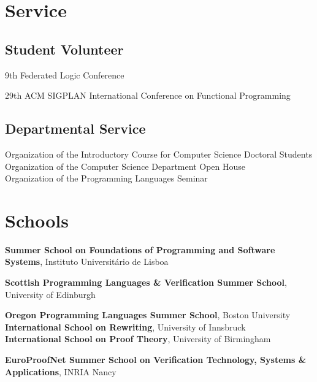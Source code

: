 \documentclass[12pt,a4paper]{moderncv}
\newenvironment{datedescription}{%
    \begin{description}[
        style=multiline,
        labelwidth=66pt,
        labelsep=6pt,
        leftmargin=72pt,
        align=right,
        font=\normalfont\itshape,
        itemsep=0.25em,
        parsep=0pt,
        topsep=0.25em
    ]
}{\end{description}}
\begin{document}

\section{Service}

\subsection{Student Volunteer}

\begin{datedescription}
    \item[2026] 9th Federated Logic Conference
    \item[2024] 29th ACM SIGPLAN International Conference on Functional Programming
\end{datedescription}

\subsection{Departmental Service}


\begin{datedescription}
    \item[2026] Organization of the Introductory Course for Computer Science Doctoral Students
    \\ Organization of the Computer Science Department Open House
    \\ Organization of the Programming Languages Seminar
\end{datedescription}


\section{Schools}

\begin{datedescription}
    \item[2026] \textbf{Summer School on Foundations of Programming and Software Systems}, Instituto Universitário de Lisboa
    \item[2025] \textbf{Scottish Programming Languages \& Verification Summer School}, University of Edinburgh
    \item[2024] \textbf{Oregon Programming Languages Summer School}, Boston University
    \\ \textbf{International School on Rewriting}, University of Innsbruck
    \\ \textbf{International School on Proof Theory}, University of Birmingham
    \item[2023] \textbf{EuroProofNet Summer School on Verification Technology, Systems \& Applications}, INRIA Nancy
\end{datedescription}
\end{document}
